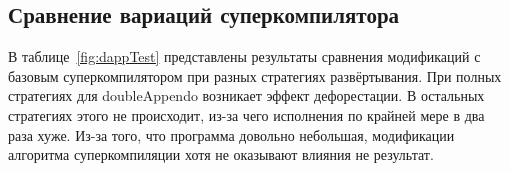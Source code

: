 \begin{itemize}
\end{itemize}

% 

\subsection{Сравнение вариаций суперкомпилятора \ukanren}

В таблице~\ref{fig:dappTest} представлены результаты сравнения модификаций
с базовым суперкомпилятором при разных стратегиях развёртывания.
При полных стратегиях для doubleAppendo возникает эффект дефорестации.
В остальных стратегиях этого не происходит, из-за чего исполнения по
крайней мере в два раза хуже. Из-за того, что программа довольно небольшая,
модификации алгоритма суперкомпиляции хотя не оказывают влияния не результат.


